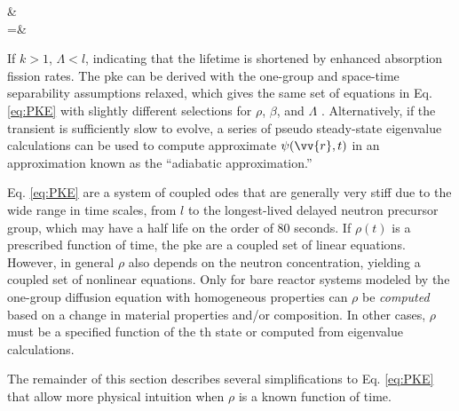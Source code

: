 \beqa
\label{eq:LambdaDef}
\Lambda\equiv&\\
=&
\eeqa

If \(k>1\), \(\Lambda<l\), indicating that the lifetime is shortened by enhanced absorption fission rates. The \gls{pke} can be derived with the one-group and space-time separability assumptions relaxed, which gives the same set of equations in Eq. \eqref{eq:PKE} with slightly different selections for \(\rho\), \(\beta\), and \(\Lambda\) \cite{duderstadt}. Alternatively, if the transient is sufficiently slow to evolve, a series of pseudo steady-state eigenvalue calculations can be used to compute approximate \(\psi(\vv{r},t)\) in an approximation known as the ``adiabatic approximation.''

Eq. \eqref{eq:PKE} are a system of coupled \glspl{ode} that are generally very stiff due to the wide range in time scales, from \(l\) to the longest-lived delayed neutron precursor group, which may have a half life on the order of 80 seconds. If \(\rho(t)\) is a prescribed function of time, the \gls{pke} are a coupled set of linear equations. However, in general \(\rho\) also depends on the neutron concentration, yielding a coupled set of nonlinear equations. Only for bare reactor systems modeled by the one-group diffusion equation with homogeneous properties can \(\rho\) be {\it computed} based on a change in material properties and/or composition. In other cases, \(\rho\) must be a specified function of the \gls{th} state or computed from eigenvalue calculations. 

The remainder of this section describes several simplifications to Eq. \eqref{eq:PKE} that allow more physical intuition when \(\rho\) is a known function of time. %

\begin{comment}
The multiplication factor \(k\) is the ratio of the rate of neutron production to the rate of neutron loss:

\beqa
\label{eq:KDef}
k\equiv&\frac{\text{rate of neutron production}}{\text{rate of neutron loss}}\\
\equiv&\frac{P(t)}{L(t)}
\eeqa

where \(P\) is the rate at which neutrons are produced in the system and \(L\) is the rate at which neutrons are lost from the system by absorption and leakage. If the neutron lifetime were constant for all neutrons, i.e. ignoring that in some scenarios a neutron may induce fission as their first reaction after birth, but in others scatter 100 times until absorption in non-fissile material, then \(k\) could easily be defined as:

\beq
\label{eq:KDef2}
k\equiv\frac{\text{number of neutrons in one generation}}{\text{number of neutrons in previous generation}}
\eeq

However, because the neutron lifetime \(l\) is not constant and identical for all neutrons, Eq. \eqref{eq:KDef} is a more useful operational definition for \(k\) than Eq. \eqref{eq:KDef2}.
\end{comment}

